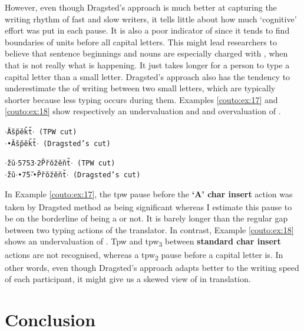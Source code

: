 \documentclass[output=paper]{LSP/langsci}
\begin{document}
However, even though Dragsted's approach is much better at capturing the writing rhythm of fast and slow writers, it tells little about how much `cognitive' effort was put in each pause. It is also a poor indicator of  since it tends to find boundaries of  units before all capital letters. This might lead researchers to believe that sentence beginnings and  nouns are especially charged with , when that is not really what is happening. It just takes longer for a person to type a capital letter than a small letter. Dragsted's approach also has the tendency to underestimate the  of writing  between two small letters, which are typically shorter because less typing occurs during them. Examples \ref{couto:ex:17} and \ref{couto:ex:18} show respectively an undervaluation and and overvaluation of .

\begin{exe}%
	\ex\label{couto:ex:17}
	\tt{$\cdot$\={ }A\u{ }s\u{ }p\u{ }e\u{ }k\u{ }t\u{ }$\cdot$} (TPW cut)\\
	\tt{$\cdot$•A\u{ }s\u{ }p\u{ }e\u{ }k\u{ }t\u{ }$\cdot$} (Dragsted's cut)
\end{exe}

\begin{exe}%
	\ex\label{couto:ex:18}
	\tt{$\cdot$\u{ }z\u{ }u\u{ }$\cdot$57\={ }53$\cdot$2P\u{ }r\u{ }o\u{ }z\u{ }e\u{ }n\u{ }t\u{ }$\cdot$} (TPW cut)\\
	\tt{$\cdot$\u{ }z\u{ }u\u{ }$\cdot$•7\u{ }5\u{ }$\cdot$•P\u{ }r\u{ }o\u{ }z\u{ }e\u{ }n\u{ }t\u{ }$\cdot$} (Dragsted's cut)
\end{exe}

In Example \ref{couto:ex:17}, the tpw\textsubscript{\={ }} pause before the \textbf{`A' char insert} action was taken by Dragsted method as being significant whereas I estimate this pause to be on the borderline of being a  or not. It is barely longer than the regular gap between two typing actions of the translator. In contrast, Example \ref{couto:ex:18} shows an undervaluation of . Tpw\textsubscript{\={ }} and tpw\textsubscript{3}  between \textbf{standard char insert} actions are not recognised, whereas a tpw\textsubscript{2} pause before a capital letter is. In other words, even though Dragsted's approach adapts better to the writing speed of each participant, it might give us a skewed view of  in translation.

\section{Conclusion}
\label{couto:sec:Conclusion}
\end{document}
